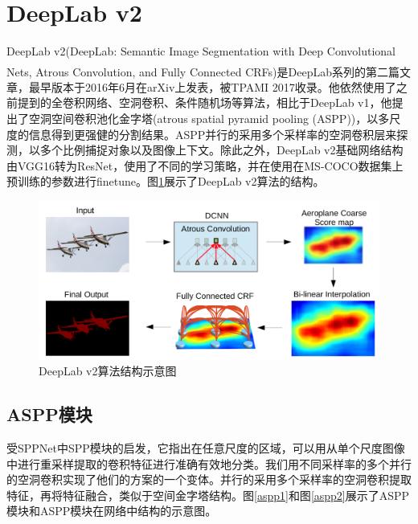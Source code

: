\documentclass[cn]{elegantbook}
\newcommand{\upcite}[1]{\textsuperscript{\textsuperscript{\cite{#1}}}}
\begin{document}
\section{DeepLab v2}
DeepLab v2(DeepLab: Semantic Image Segmentation with Deep Convolutional Nets, Atrous Convolution, and Fully Connected CRFs)\upcite{chen2018deeplab}是DeepLab系列的第二篇文章，最早版本于2016年6月在arXiv上发表，被TPAMI 2017收录。他依然使用了之前提到的全卷积网络、空洞卷积、条件随机场等算法，相比于DeepLab v1，他提出了空洞空间卷积池化金字塔(atrous spatial pyramid pooling (ASPP))，以多尺度的信息得到更强健的分割结果。ASPP并行的采用多个采样率的空洞卷积层来探测，以多个比例捕捉对象以及图像上下文。除此之外，DeepLab v2基础网络结构由VGG16转为ResNet，使用了不同的学习策略，并在使用在MS-COCO数据集上预训练的参数进行finetune。图\ref{deeplabv2}展示了DeepLab v2算法的结构。

\begin{figure}[!h]
	\centering
	\includegraphics[width=\textwidth]{images/deeplabv2}
	\caption{\label{deeplabv2}DeepLab v2算法结构示意图}
\end{figure}

\subsection{ASPP模块}
受SPPNet中SPP模块的启发，它指出在任意尺度的区域，可以用从单个尺度图像中进行重采样提取的卷积特征进行准确有效地分类。我们用不同采样率的多个并行的空洞卷积实现了他们的方案的一个变体。并行的采用多个采样率的空洞卷积提取特征，再将特征融合，类似于空间金字塔结构。图\ref{aspp1}和图\ref{aspp2}展示了ASPP模块和ASPP模块在网络中结构的示意图。
\end{document}
